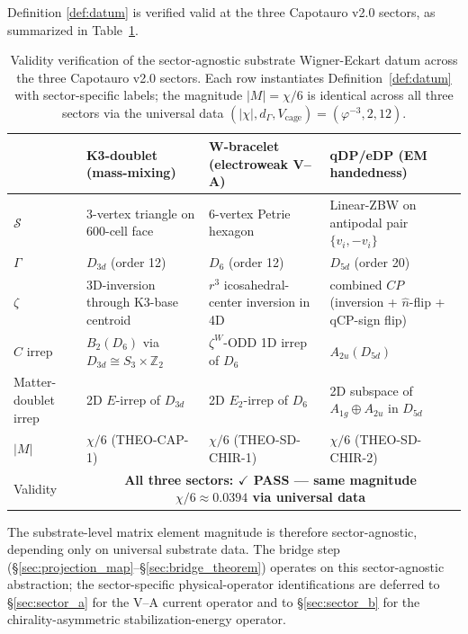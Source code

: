 \documentclass[11pt,letterpaper]{article}
\newcommand{\Dsix}{D_6}
\newcommand{\Sthree}{S_3}
\newcommand{\Vcage}{V_{\text{cage}}}
\newcommand{\dGamma}{d_\Gamma}
\begin{document}
Definition \ref{def:datum} is verified valid at the three Capotauro v2.0 sectors, as summarized in Table~\ref{tab:three_sectors}.

\begin{table}[h!]
\caption{Validity verification of the sector-agnostic substrate Wigner-Eckart datum across the three Capotauro v2.0 sectors. Each row instantiates Definition~\ref{def:datum} with sector-specific labels; the magnitude $|M| = \chi/6$ is identical across all three sectors via the universal data $(|\chi|, \dGamma, \Vcage) = (\varphi^{-3}, 2, 12)$.}
\label{tab:three_sectors}
\begin{center}
\small
\begin{tabular}{lp{3.3cm}p{3.5cm}p{3.5cm}}
\toprule
& \textbf{K3-doublet} (mass-mixing) & \textbf{W-bracelet} (electroweak V--A) & \textbf{qDP/eDP} (EM handedness) \\
\midrule
$\mathcal{S}$ & 3-vertex triangle on 600-cell face & 6-vertex Petrie hexagon & Linear-ZBW on antipodal pair $\{v_i, -v_i\}$ \\
$\Gamma$ & $D_{3d}$ (order 12) & $\Dsix$ (order 12) & $D_{5d}$ (order 20) \\
$\zeta$ & 3D-inversion through K3-base centroid & $r^3$ icosahedral-center inversion in 4D & combined $CP$ (inversion + $\hat{n}$-flip + qCP-sign flip) \\
$\hat{C}$ irrep & $B_2(\Dsix)$ via $D_{3d} \cong \Sthree \times \mathbb{Z}_2$ & $\zeta^W$-ODD 1D irrep of $\Dsix$ & $A_{2u}(D_{5d})$ \\
Matter-doublet irrep & 2D $E$-irrep of $D_{3d}$ & 2D $E_2$-irrep of $\Dsix$ & 2D subspace of $A_{1g} \oplus A_{2u}$ in $D_{5d}$ \\
$|M|$ & $\chi/6$ (THEO-CAP-1) & $\chi/6$ (THEO-SD-CHIR-1) & $\chi/6$ (THEO-SD-CHIR-2) \\
\midrule
Validity & \multicolumn{3}{c}{\textbf{All three sectors: $\checkmark$ PASS — same magnitude $\chi/6 \approx 0.0394$ via universal data}} \\
\bottomrule
\end{tabular}
\end{center}
\end{table}

The substrate-level matrix element magnitude is therefore sector-agnostic, depending only on universal substrate data. The bridge step (§\ref{sec:projection_map}--§\ref{sec:bridge_theorem}) operates on this sector-agnostic abstraction; the sector-specific physical-operator identifications are deferred to §\ref{sec:sector_a} for the V--A current operator and to §\ref{sec:sector_b} for the chirality-asymmetric stabilization-energy operator.
\end{document}
